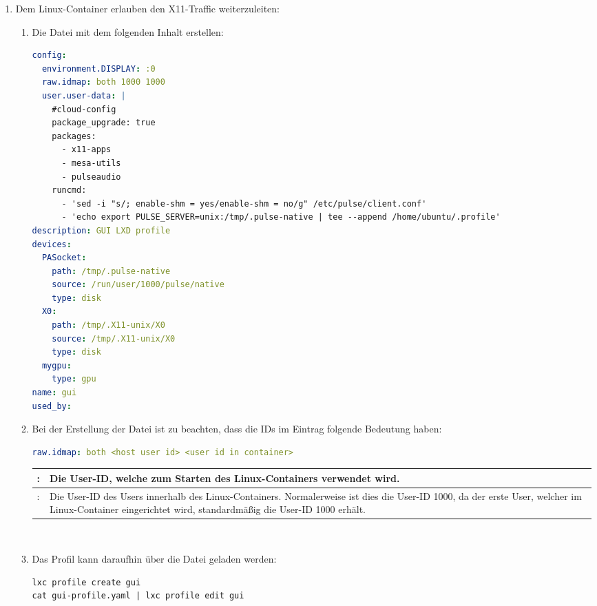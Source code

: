 \begin{enumerate}[label*=\arabic*.]
    \item Dem Linux-Container erlauben den X11-Traffic weiterzuleiten:
        \begin{enumerate}[label*=\arabic*.]
            \item Die Datei  mit dem folgenden Inhalt erstellen:
                \begin{lstlisting}[language=yaml]
config:
  environment.DISPLAY: :0
  raw.idmap: both 1000 1000
  user.user-data: |
    #cloud-config
    package_upgrade: true
    packages:
      - x11-apps
      - mesa-utils
      - pulseaudio
    runcmd:
      - 'sed -i "s/; enable-shm = yes/enable-shm = no/g" /etc/pulse/client.conf'
      - 'echo export PULSE_SERVER=unix:/tmp/.pulse-native | tee --append /home/ubuntu/.profile'
description: GUI LXD profile
devices:
  PASocket:
    path: /tmp/.pulse-native
    source: /run/user/1000/pulse/native
    type: disk
  X0:
    path: /tmp/.X11-unix/X0
    source: /tmp/.X11-unix/X0
    type: disk
  mygpu:
    type: gpu
name: gui
used_by:
                \end{lstlisting}

                \item Bei der Erstellung der Datei  ist zu beachten, dass die IDs im Eintrag  folgende Bedeutung haben:
                    \begin{lstlisting}[language=yaml]
raw.idmap: both <host user id> <user id in container>
                    \end{lstlisting}

                    \begin{tabular}{|>{\raggedright\arraybackslash}p{}|>{\raggedright\arraybackslash}p{}|}
                        \hline
                        <host user id>: & Die User-ID, welche zum Starten des Linux-Containers verwendet wird.\\
                        \hline
                        <user id in container>: & Die User-ID des Users innerhalb des Linux-Containers. Normalerweise ist dies die User-ID 1000, da der erste User, welcher im Linux-Container eingerichtet wird, standardmäßig die User-ID 1000 erhält.\\
                        \hline
                    \end{tabular}\\

                \item Das Profil kann daraufhin über die Datei  geladen werden:
                    \begin{lstlisting}[style=bash]
lxc profile create gui
cat gui-profile.yaml | lxc profile edit gui
                    \end{lstlisting}


\end{enumerate}
\end{enumerate}
